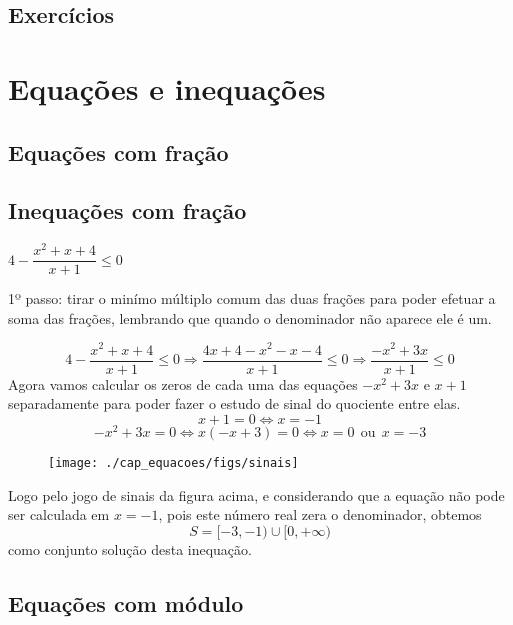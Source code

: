   \section{Exercícios}

\construirExer

 \chapter{Equações e inequações}

 \section{Equações com fração}
 \section{Inequações com fração}

 \begin{exem}
  $4 - \dfrac{x^2+x+4}{x+1} \leq 0$
   \vskip0.3cm

  1º passo: tirar o minímo múltiplo comum das duas frações para poder efetuar a soma das frações, lembrando que quando o denominador não aparece ele é um.

  \[4 - \frac{x^2+x+4}{x+1} \leq 0 \Rightarrow
    \frac{4x+4-x^2-x-4}{x+1} \leq 0 \Rightarrow
    \frac{-x^2 + 3x}{x+1} \leq 0
  \]
  Agora vamos calcular os zeros de cada uma das equações $-x^2 + 3x$ e $x+1$ separadamente para poder fazer o estudo de sinal do quociente entre elas.
\begin{equation}
x+1=0 \Leftrightarrow x= -1
\end{equation}
\begin{equation}
-x^2 + 3x= 0 \Leftrightarrow x(-x+3)=0 \Leftrightarrow x=0 \ \ \text{ou} \ \ x=-3
\end{equation}
   \begin{figure}[H]
 \centering
 \texttt{[image: ./cap\_equacoes/figs/sinais]}
 \end{figure}

 Logo pelo jogo de sinais da figura acima, e considerando que a equação não pode ser calculada em $x= -1$, pois este número real zera o denominador, obtemos
\begin{equation}
S= [-3, -1) \cup [0, +\infty)
\end{equation}
 como conjunto solução desta inequação.

 \end{exem}


 \section{Equações com módulo}

